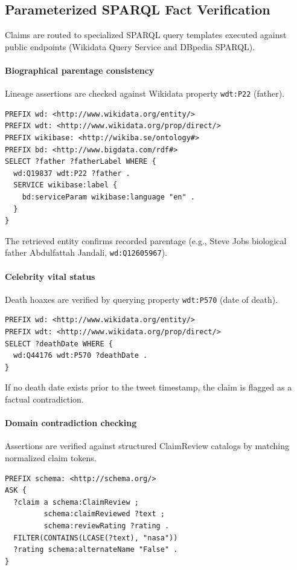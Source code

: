 \documentclass[10pt,twocolumn,a4paper]{article}
\begin{document}
\subsection{Parameterized SPARQL Fact Verification}
Claims are routed to specialized SPARQL query templates executed against public endpoints (Wikidata Query Service and DBpedia SPARQL).
 
\paragraph{Biographical parentage consistency}
Lineage assertions are checked against Wikidata property \texttt{wdt:P22} (father).
\begin{lstlisting}[caption={Biographical parentage query template.},label={lst:parentage}]
PREFIX wd: <http://www.wikidata.org/entity/>
PREFIX wdt: <http://www.wikidata.org/prop/direct/>
PREFIX wikibase: <http://wikiba.se/ontology#>
PREFIX bd: <http://www.bigdata.com/rdf#>
SELECT ?father ?fatherLabel WHERE {
  wd:Q19837 wdt:P22 ?father .
  SERVICE wikibase:label {
    bd:serviceParam wikibase:language "en" .
  }
}
\end{lstlisting}
The retrieved entity confirms recorded parentage (e.g., Steve Jobs biological father Abdulfattah Jandali, \texttt{wd:Q12605967}).
 
\paragraph{Celebrity vital status}
Death hoaxes are verified by querying property \texttt{wdt:P570} (date of death).
\begin{lstlisting}[caption={Celebrity vital-status query template.},label={lst:death}]
PREFIX wd: <http://www.wikidata.org/entity/>
PREFIX wdt: <http://www.wikidata.org/prop/direct/>
SELECT ?deathDate WHERE {
  wd:Q44176 wdt:P570 ?deathDate .
}
\end{lstlisting}
If no death date exists prior to the tweet timestamp, the claim is flagged as a factual contradiction.
 
\paragraph{Domain contradiction checking}
Assertions are verified against structured ClaimReview catalogs by matching normalized claim tokens.
\begin{lstlisting}[caption={Domain claim contradiction check.},label={lst:claimreview}]
PREFIX schema: <http://schema.org/>
ASK {
  ?claim a schema:ClaimReview ;
         schema:claimReviewed ?text ;
         schema:reviewRating ?rating .
  FILTER(CONTAINS(LCASE(?text), "nasa"))
  ?rating schema:alternateName "False" .
}
\end{lstlisting}
 
\end{document}
